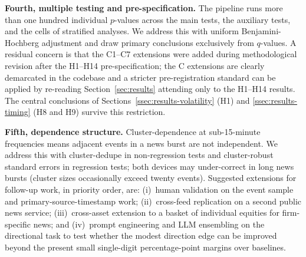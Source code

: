 \textbf{Fourth, multiple testing and pre-specification.} The
pipeline runs more than one hundred individual $p$-values across the
main tests, the auxiliary tests, and the cells of stratified
analyses. We address this with uniform Benjamini-Hochberg
adjustment \citep{benjamini1995controlling} and draw primary
conclusions exclusively from $q$-values. A residual concern is that
the C1--C7 extensions were added during methodological revision
after the H1--H14 pre-specification; the C extensions are clearly
demarcated in the codebase and a stricter pre-registration standard
can be applied by re-reading Section~\ref{sec:results} attending
only to the H1--H14 results. The central conclusions of
Sections~\ref{ssec:results-volatility} (H1) and
\ref{ssec:results-timing} (H8 and H9) survive this restriction.

\textbf{Fifth, dependence structure.} Cluster-dependence at
sub-15-minute frequencies means adjacent events in a news burst are
not independent. We address this with cluster-dedupe in
non-regression tests and cluster-robust standard errors in
regression tests; both devices may under-correct in long news bursts
(cluster sizes occasionally exceed twenty events). Suggested
extensions for follow-up work, in priority order, are: (i)~human
validation on the event sample and primary-source-timestamp work;
(ii)~cross-feed replication on a second public news service;
(iii)~cross-asset extension to a basket of individual equities for
firm-specific news; and (iv)~prompt engineering and LLM ensembling
on the directional task to test whether the modest direction edge
can be improved beyond the present small single-digit
percentage-point margins over baselines.
